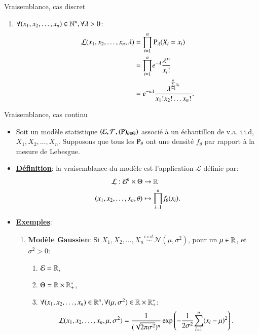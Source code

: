 \begin{frame}[allowframebreaks]{Vraisemblance, cas discret}
\begin{itemize}
\begin{enumerate}
\begin{enumerate}[-]
                 \item $\forall (x_1, x_2, \ldots, x_n)\in \mathbb{N}^{n}, \forall \lambda >0$: 
                 \begin{align*}
                     \mathcal{L}(x_1, x_2, \ldots, x_n, \lambda) &= \underset{i=1}{\overset{n}{\prod}} \operatorname{P}_\lambda(X_i=x_i)\\
                     &=\underset{i=1}{\overset{n}{\prod}} e^{-\lambda}\frac{\lambda^{x_i}}{x_i!}\\
                     &= e^{-n\lambda}\frac{\lambda^{\underset{i=1}{\overset{n}{\sum}} x_i}}{x_1!x_2!\ldots x_n!}.
                 \end{align*}
             \end{enumerate}
        \end{enumerate}
    \end{itemize}
\end{frame}

\begin{frame}[allowframebreaks]{Vraisemblance, cas continu}
    \begin{itemize}
        \item Soit un modèle statistique $\left(\mathcal{E}, \mathcal{F}, (\operatorname{P})_{\theta\in\Theta}\right)$ 
        associé à un échantillon de v.a. i.i.d,  $X_1, X_2, \ldots, X_n$.  Supposons que tous les $\operatorname{P}_\theta$ 
        ont une densité $f_\theta$ par rapport à la mesure de Lebesgue.
        \item \textbf{\underline{Définition}}: la vraisemblance du modèle est l'application $\mathcal{L}$ 
        définie par: 
        \begin{align*}
            \mathcal{L}: \mathcal{E}^n\times\Theta &\rightarrow \mathbb{R}\\
            (x_1, x_2, \ldots, x_n, \theta) &\mapsto \underset{i=1}{\overset{n}{\prod}} f_\theta(x_i).
        \end{align*}
        \framebreak
        \item \textbf{\underline{Exemples}}: 
        \begin{enumerate}
            \item \textbf{Modèle Gaussien}: Si $X_1, X_2, \ldots, X_n \overset{i.i.d.}{\sim}
            \mathcal{N}\left(\mu, \sigma^2\right)$, pour un $\mu \in \mathbb{R}$, et $\sigma^2>0$: 
            \begin{enumerate}[-]
                \item $\mathcal{E}= \mathbb{R}$,
                \item $\Theta = \mathbb{R}\times \mathbb{R}_{+}^*$,
                \item $\forall(x_1, x_2, \ldots, x_n)\in \mathbb{R}^n, \forall (\mu, \sigma^2)\in \mathbb{R}\times \mathbb{R}_+^*$:
                \begin{align*}
                    \mathcal{L}(x_1, x_2, \ldots, x_n, \mu, \sigma^2)&= \frac{1}{(\sqrt{2\pi\sigma^2})^n}
                    \exp\left(-\frac{1}{2\sigma^2}\underset{i=1}{\overset{n}{\sum}}(x_i-\mu)^2\right).
                \end{align*}
            \end{enumerate}
        \end{enumerate}
    \end{itemize}
\end{frame}

